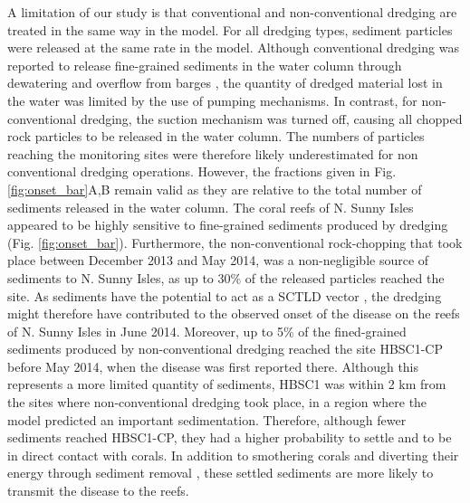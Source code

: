 A limitation of our study is that conventional and non-conventional dredging are treated in the same way in the model. For all dredging types, sediment particles were released at the same rate in the model. Although conventional dredging was reported to release fine-grained sediments in the water column through dewatering and overflow from barges \citep{jones2016assessing}, the quantity of dredged material lost in the water was limited by the use of pumping mechanisms. In contrast, for non-conventional dredging, the suction mechanism was turned off, causing all chopped rock particles to be released in the water column. The numbers of particles reaching the monitoring sites were therefore likely underestimated for non conventional dredging operations. However, the fractions given in Fig. \ref{fig:onset_bar}A,B remain valid as they are relative to the total number of sediments released in the water column. The coral reefs of N. Sunny Isles appeared to be highly sensitive to fine-grained sediments produced by dredging (Fig. \ref{fig:onset_bar}). Furthermore, the non-conventional rock-chopping that took place between December 2013 and May 2014, was a non-negligible source of sediments to N. Sunny Isles, as up to 30\% of the released particles reached the site. As sediments have the potential to act as a SCTLD vector \citep{rosales2020rhodobacterales, studivan2022reef}, the dredging might therefore have contributed to the observed onset of the disease on the reefs of N. Sunny Isles in June 2014. Moreover, up to 5\% of the fined-grained sediments produced by non-conventional dredging reached the site HBSC1-CP before May 2014, when the disease was first reported there. Although this represents a more limited quantity of sediments, HBSC1 was within 2 km from the sites where non-conventional dredging took place, in a region where the model predicted an important sedimentation. Therefore, although fewer sediments reached HBSC1-CP, they had a higher probability to settle and to be in direct contact with corals. In addition to smothering corals and diverting their energy through sediment removal \citep{erftemeijer2012environmental}, these settled sediments are more likely to transmit the disease to the reefs.

